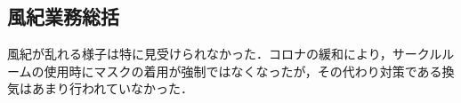 \subsection*{風紀業務総括}

風紀が乱れる様子は特に見受けられなかった．コロナの緩和により，サークルルームの使用時にマスクの着用が強制ではなくなったが，その代わり対策である換気はあまり行われていなかった．